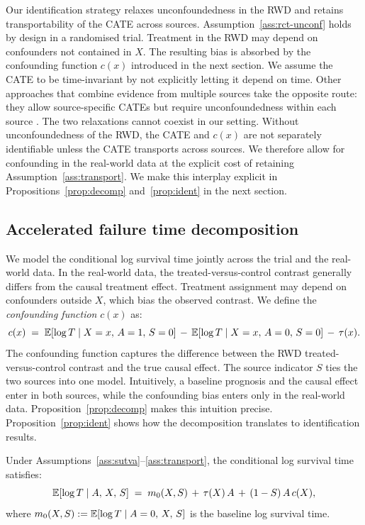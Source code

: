Our identification strategy relaxes unconfoundedness in the RWD and retains transportability of the CATE across sources.
Assumption~\ref{ass:rct-unconf} holds by design in a randomised trial.
Treatment in the RWD may depend on confounders not contained in $X$.
The resulting bias is absorbed by the confounding function $c(x)$ introduced in the next section.
We assume the CATE to be time-invariant by not explicitly letting it depend on time.
Other approaches that combine evidence from multiple sources take the opposite route: they allow source-specific CATEs but require unconfoundedness within each source \citep{stuart2011propensity, dahabreh2019generalizing, shyr2025multistudy}.
The two relaxations cannot coexist in our setting.
Without unconfoundedness of the RWD, the CATE and $c(x)$ are not separately identifiable unless the CATE transports across sources.
We therefore allow for confounding in the real-world data at the explicit cost of retaining Assumption~\ref{ass:transport}.
We make this interplay explicit in Propositions~\ref{prop:decomp} and~\ref{prop:ident} in the next section.

\subsection{Accelerated failure time decomposition}

We model the conditional log survival time jointly across the trial and the real-world data.
In the real-world data, the treated-versus-control contrast generally differs from the causal treatment effect.
Treatment assignment may depend on confounders outside $X$, which bias the observed contrast.
We define the \emph{confounding function} $c(x)$ \citep{robins2000sensitivity} as:
\begin{equation}
c(x) \;=\; \mathbb{E}[\log T \mid X = x,\, A = 1,\, S = 0] \,-\, \mathbb{E}[\log T \mid X = x,\, A = 0,\, S = 0] \,-\, \tau(x).
\label{eq:cf}
\end{equation}
The confounding function captures the difference between the RWD treated-versus-control contrast and the true causal effect.
The source indicator $S$ ties the two sources into one model.
Intuitively, a baseline prognosis and the causal effect enter in both sources, while the confounding bias enters only in the real-world data.
Proposition~\ref{prop:decomp} makes this intuition precise.
Proposition~\ref{prop:ident} shows how the decomposition translates to identification results.
\begin{proposition}\label{prop:decomp}
Under Assumptions~\ref{ass:sutva}--\ref{ass:transport}, the conditional log survival time satisfies:
\begin{equation}
\mathbb{E}[\log T \mid A,\, X,\, S] \;=\; m_0(X, S) \,+\, \tau(X)\,A \,+\, (1 - S)\,A\,c(X),
\label{eq:decomp}
\end{equation}
where $m_0(X, S) := \mathbb{E}[\log T \mid A = 0,\, X,\, S]$ is the baseline log survival time.
\end{proposition}

